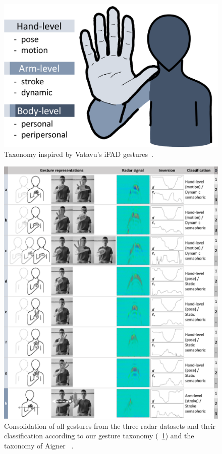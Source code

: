 \begin{figure}[b]
    \centering
    \includegraphics[width=.60\linewidth]{Figures/RadarExperiments/Datasets/20Gestures/gesture-taxonomy.pdf}
    \vspace{-2pt}
    \caption{Taxonomy inspired by Vatavu's iFAD gestures~\cite{Vatavu:2023b}.}
    \label{fig:radar-experiments:taxonomy}
    \vspace{-6pt}
\end{figure}

\begin{figure}
    \centering
    \includegraphics[width=\linewidth]{Figures/RadarExperiments/Datasets/gesture-table-new-1.pdf}
    \caption{Consolidation of all gestures from the three radar datasets and their classification according to our gesture taxonomy (\fig~\ref{fig:radar-experiments:taxonomy}) and the taxonomy of Aigner \etal~\cite{Aigner:2012}.}
    \label{fig:radar-experiments:gestures-a}
    \vspace{-8pt}
\end{figure}

